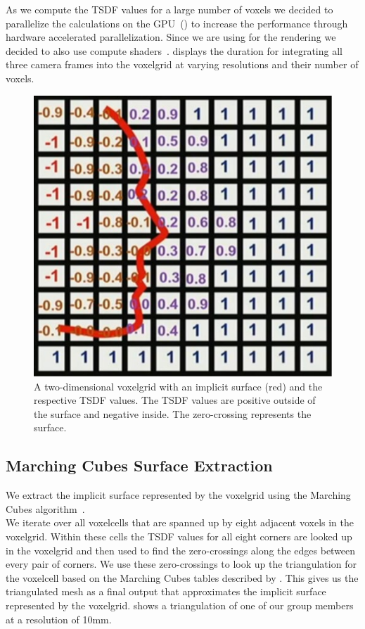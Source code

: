 \documentclass[10pt,twocolumn,letterpaper]{article}
\begin{document}
As we compute the TSDF values for a large number of voxels we decided to parallelize the calculations on the GPU~() to increase the performance through hardware accelerated parallelization. Since we are using \opengl{} for the rendering we decided to also use \opengl{} compute shaders~\cite{Authors1}.  displays the duration for integrating all three camera frames into the voxelgrid at varying resolutions and their number of voxels. \\

\begin{figure}[t]
\begin{center}
\includegraphics[width=0.6\linewidth]{imgs/tsdf}
\end{center}
 \caption{A two-dimensional voxelgrid with an implicit surface (red) and the respective TSDF values. The TSDF values are positive outside of the surface and negative inside. The zero-crossing represents the surface.}
 \label{fig:voxelgrid}
\end{figure}

\subsection{Marching Cubes Surface Extraction}
We extract the implicit surface represented by the voxelgrid using the Marching Cubes algorithm~\cite{MarchingCubes}.\\
We iterate over all voxelcells that are spanned up by eight adjacent voxels in the voxelgrid. Within these cells the TSDF values for all eight corners are looked up in the voxelgrid and then used to find the zero-crossings along the edges between every pair of corners. We use these zero-crossings to look up the triangulation for the voxelcell based on the Marching Cubes tables described by \cite{MarchingCubes}. This gives us the triangulated mesh as a final output that approximates the implicit surface represented by the voxelgrid.  shows a triangulation of one of our group members at a resolution of 10mm.
\end{document}
